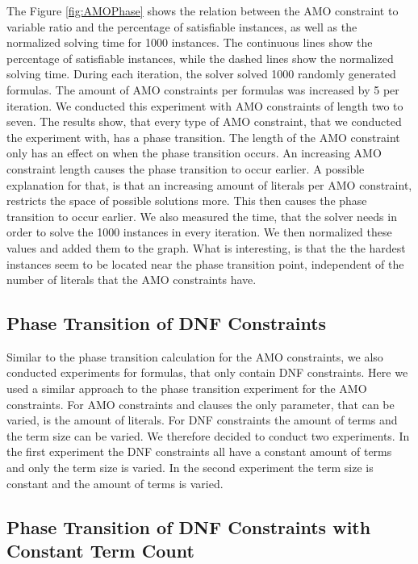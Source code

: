 The Figure \ref{fig:AMOPhase} shows the relation between the AMO constraint to variable ratio and the percentage of satisfiable instances, as well as the normalized solving time for 1000 instances. The continuous lines show the percentage of satisfiable instances, while the dashed lines show the normalized solving time. During each iteration, the solver solved 1000 randomly generated formulas. The amount of AMO constraints per formulas was increased by 5 per iteration. We conducted this experiment with AMO constraints of length two to seven. The results show, that every type of AMO constraint, that we conducted the experiment with, has a phase transition. The length of the AMO constraint only has an effect on when the phase transition occurs. An increasing AMO constraint length causes the phase transition to occur earlier. A possible explanation for that, is that an increasing amount of literals per AMO constraint, restricts the space of possible solutions more. This then causes the phase transition to occur earlier. We also measured the time, that the solver needs in order to solve the 1000 instances in every iteration. We then normalized these values and added them to the graph. What is interesting, is that the the hardest instances seem to be located near the phase transition point, independent of the number of literals that the AMO constraints have.

\subsection{Phase Transition of DNF Constraints}

Similar to the phase transition calculation for the AMO constraints, we also conducted experiments for formulas, that only contain DNF constraints. Here we used a similar approach to the phase transition experiment for the AMO constraints. For AMO constraints and clauses the only parameter, that can be varied, is the amount of literals. For DNF constraints the amount of terms and the term size can be varied. We therefore decided to conduct two experiments. In the first experiment the DNF constraints all have a constant amount of terms and only the term size is varied. In the second experiment the term size is constant and the amount of terms is varied.

\newpage

\subsection{Phase Transition of DNF Constraints with Constant Term Count}

